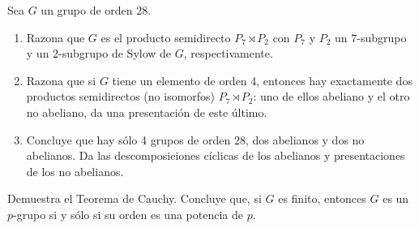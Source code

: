 \documentclass[12pt]{article}
\begin{document}
    \begin{ejercicio}[2 puntos]
        Sea $G$ un grupo de orden 28.
        \begin{enumerate}[label=(\alph*)]
            \item Razona que $G$ es el producto semidirecto $P_7 \rtimes P_2$ con $P_7$ y $P_2$ un $7$-subgrupo y un $2$-subgrupo de Sylow de $G$, respectivamente.
            \item Razona que si $G$ tiene un elemento de orden 4, entonces hay exactamente dos productos semidirectos (no isomorfos) $P_7 \rtimes P_2$: uno de ellos abeliano y el otro no abeliano, da una presentación de este último.
            \item Concluye que hay sólo 4 grupos de orden 28, dos abelianos y dos no abelianos. Da las descomposiciones cíclicas de los abelianos y presentaciones de los no abelianos.
        \end{enumerate}
    \end{ejercicio}

    \begin{ejercicio}[2 puntos]
        Demuestra el Teorema de Cauchy. Concluye que, si $G$ es finito, entonces $G$ es un $p$-grupo si y sólo si su orden es una potencia de $p$.
    \end{ejercicio}

    \newpage
    \setcounter{ejercicio}{0}
\end{document}
